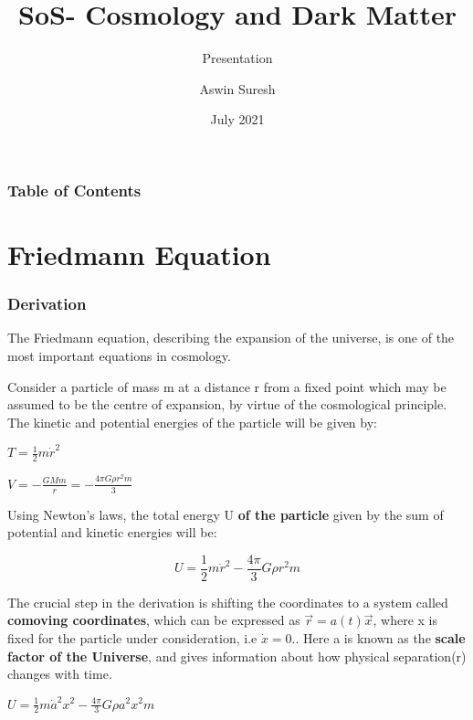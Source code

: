 \documentclass{beamer}
\title[SoS Presentation]
{SoS- Cosmology and Dark Matter}
\subtitle{Presentation}
\author{Aswin Suresh}
\date{July 2021}
\begin{document}
\frame{\titlepage}


\begin{frame}
\frametitle{Table of Contents}
\tableofcontents
\end{frame}


\section{Friedmann Equation}

\begin{frame}[allowframebreaks]
\frametitle{Derivation}
The Friedmann equation, describing the expansion of the universe, is one of the most important equations in cosmology.

Consider a particle of mass m at a distance r from a fixed point which may be assumed to be the centre of expansion, by virtue of the cosmological principle. The kinetic and potential energies of the particle will be given by:

\begin{center}
    $T = \frac{1}{2}m\dot{r}^2$ \\
\end{center}

\begin{center}
    $V = -\frac{GMm}{r} = -\frac{4\pi G \rho r^2 m}{3}$
\end{center}

Using Newton's laws, the total energy U \textbf{of the particle} given by the sum of potential and kinetic energies will be:

\begin{equation}
U = \frac{1}{2}m\dot{r}^2-\frac{4\pi}{3}G{\rho}r^2m
\end{equation}

The crucial step in the derivation is shifting the coordinates to a system called \textbf{comoving coordinates}, which can be expressed as $\vec{r}=a(t)\vec{x}$, where x is fixed for the particle under consideration, i.e $\dot{x}=0.$. Here a is known as the \textbf{scale factor of the Universe}, and gives information about how physical separation(r) changes with time.

\begin{center}
    $U = {\frac{1}{2}}{m{\dot{a}^2}{x^2}}-\frac{4\pi}{3}G{\rho}{a^2}{x^2}m$
\end{center}


\end{frame}
\end{document}
